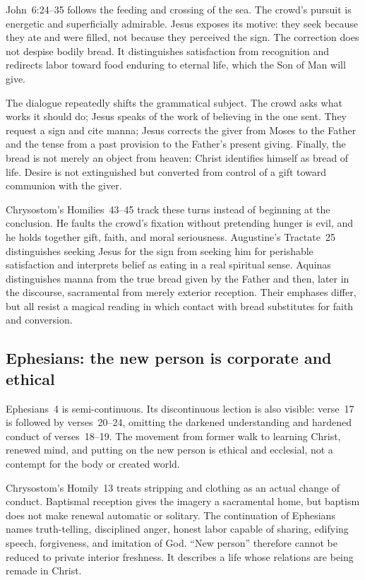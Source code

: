 John~6:24--35 follows the feeding and crossing of the sea. The crowd's pursuit
is energetic and superficially admirable. Jesus exposes its motive: they seek
because they ate and were filled, not because they perceived the sign. The
correction does not despise bodily bread. It distinguishes satisfaction from
recognition and redirects labor toward food enduring to eternal life, which
the Son of Man will give.

The dialogue repeatedly shifts the grammatical subject. The crowd asks what
works it should do; Jesus speaks of the work of believing in the one sent.
They request a sign and cite manna; Jesus corrects the giver from Moses to the
Father and the tense from a past provision to the Father's present giving.
Finally, the bread is not merely an object from heaven: Christ identifies
himself as bread of life. Desire is not extinguished but converted from control
of a gift toward communion with the giver.

Chrysostom's Homilies~43--45 track these turns instead of beginning at the
conclusion. He faults the crowd's fixation without pretending hunger is evil,
and he holds together gift, faith, and moral seriousness. Augustine's
Tractate~25 distinguishes seeking Jesus for the sign from seeking him for
perishable satisfaction and interprets belief as eating in a real spiritual
sense. Aquinas distinguishes manna from the true bread given by the Father and
then, later in the discourse, sacramental from merely exterior reception.
Their emphases differ, but all resist a magical reading in which contact with
bread substitutes for faith and conversion.

\subsection*{Ephesians: the new person is corporate and ethical}

Ephesians~4 is semi-continuous. Its discontinuous lection is also visible: verse~17 is followed
by verses~20--24, omitting the darkened understanding and hardened conduct of
verses~18--19. The movement from former walk to learning Christ, renewed mind,
and putting on the new person is ethical and ecclesial, not a contempt for the
body or created world.

Chrysostom's Homily~13 treats stripping and clothing as an actual change of
conduct. Baptismal reception gives the imagery a sacramental home, but baptism
does not make renewal automatic or solitary. The continuation of Ephesians
names truth-telling, disciplined anger, honest labor capable of sharing,
edifying speech, forgiveness, and imitation of God. “New person” therefore
cannot be reduced to private interior freshness. It describes a life whose
relations are being remade in Christ.

